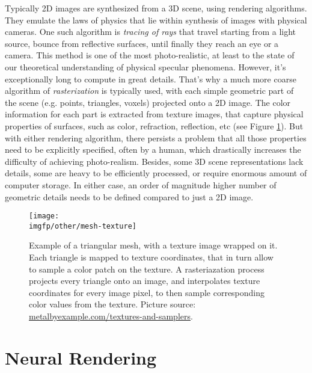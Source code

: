 Typically 2D images are synthesized from a 3D scene, using rendering algorithms. They emulate the laws of physics that lie within synthesis of images with physical cameras. One such algorithm is \textit{tracing of rays} that travel starting from a light source, bounce from reflective surfaces, until finally they reach an eye or a camera. This method is one of the most photo-realistic, at least to the state of our theoretical understanding of physical specular phenomena. However, it's exceptionally long to compute in great details. That's why a much more coarse algorithm of \textit{rasterization} is typically used, with each simple geometric part of the scene (e.g. points, triangles, voxels) projected onto a 2D image. The color information for each part is extracted from texture images, that capture physical properties of surfaces, such as color, refraction, reflection, etc (see Figure \ref{intro:fig:mesh-texture}). But with either rendering algorithm, there persists a problem that all those properties need to be explicitly specified, often by a human, which drastically increases the difficulty of achieving photo-realism. Besides, some 3D scene representations lack details, some are heavy to be efficiently processed, or require enormous amount of computer storage. In either case, an order of magnitude higher number of geometric details needs to be defined compared to just a 2D image. 

\begin{figure}[h!]
	\centering
	\texttt{[image: \\imgfp/other/mesh-texture]}
	\caption{Example of a triangular mesh, with a texture image wrapped on it. Each triangle is mapped to texture coordinates, that in turn allow to sample a color patch on the texture. A rasteriazation process projects every triangle onto an image, and interpolates texture coordinates for every image pixel, to then sample corresponding color values from the texture. Picture source: \href{https://metalbyexample.com/textures-and-samplers/}{metalbyexample.com/textures-and-samplers}.}
	\label{intro:fig:mesh-texture}
\end{figure}


\section{Neural Rendering}\label{intro:nrender}

